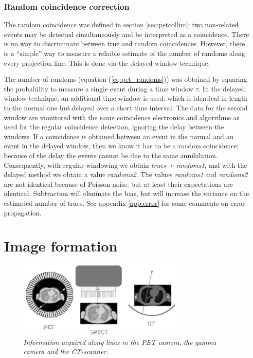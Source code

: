 \documentclass[11pt,oneside]{book}
\begin{document}
\subsection{Random coincidence correction} \label{sec:randoms}
The random coincidence was defined in section \ref{sec:petcollim}: two
non-related events may be detected simultaneously and be interpreted as a
coincidence. There is no way to discriminate between true and random
coincidences. However, there is a ``simple'' way to measure a reliable
estimate of the number of randoms along every projection line. This is done
via the delayed window technique.

The number of randoms (equation (\ref{eq:pet_randoms})) was obtained by
squaring the probability to measure a single event during a time window
$\tau$. In the delayed window technique, an additional time window is used,
which is identical in length to the normal one but delayed over a short time
interval. The data for the second window are monitored with the same
coincidence electronics and algorithms as used for the regular coincidence
detection, ignoring the delay between the windows. If a coincidence is
obtained between an event in the normal and an event in the delayed window,
then we know it has to be a random coincidence: because of the delay the
events cannot be due to the same annihilation. Consequently, with regular
windowing we obtain {\em trues + randoms1}, and with the delayed method we
obtain a value {\em randoms2}. The values {\em randoms1} and {\em randoms2}
are not identical because of Poisson noise, but at least their expectations
are identical. Subtraction will eliminate the bias, but will increase the
variance on the estimated number of trues. See appendix \ref{app:error} for
some comments on error propagation.

\chapter{Image formation} \label{ch:image_formation}

%
%
%
\begin{figure}[tb]
\centering
\includegraphics[width=0.75\textwidth]{figs/fig_spect_pet_ct.pdf}
\caption{\label{fig:spect_pet_ct_bis} \emph{Information acquired along lines
in the PET camera, the gamma camera and the CT-scanner.}}
\end{figure}
\end{document}
